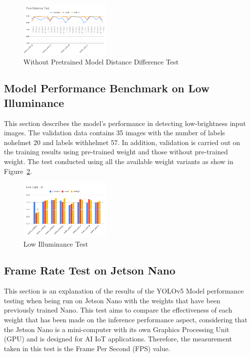 \begin{figure}[ht]
  \centering
  \includegraphics[width=0.4\textwidth]{gambar/utilities/pure_dist_test.png}
  \caption{Without Pretrained Model Distance Difference Test}
  \label{fig:pure_dist_test}  
\end{figure}

\subsection{Model Performance Benchmark on Low Illuminance}
\label{subsec:model_lowillum_test}

\par This section describes the model's performance in detecting low-brightness input images. The validation data contains 35 images with the number of labels no\textunderscore helmet 20 and labels with\textunderscore helmet 57. In addition, validation is carried out on the training results using pre-trained weight and those without pre-trained weight. The test conducted using all the available weight variants as show in Figure~\ref{fig:lowillum_test}.

\begin{figure}[ht]
  \centering
  \includegraphics[width=0.4\textwidth]{gambar/utilities/lowlight_test.png}
  \caption{Low Illuminance Test}
  \label{fig:lowillum_test}  
\end{figure}

\subsection{Frame Rate Test on Jetson Nano}
\label{subsec:model_jetsonnano_test}

\par This section is an explanation of the results of the YOLOv5 Model performance testing when being run on Jetson Nano with the weights that have been previously trained Nano. This test aims to compare the effectiveness of each weight that has been made on the inference performance aspect, considering that the Jetson Nano is a mini-computer with its own Graphics Processing Unit (GPU) and is designed for AI IoT applications. Therefore, the measurement taken in this test is the Frame Per Second (FPS) value.

